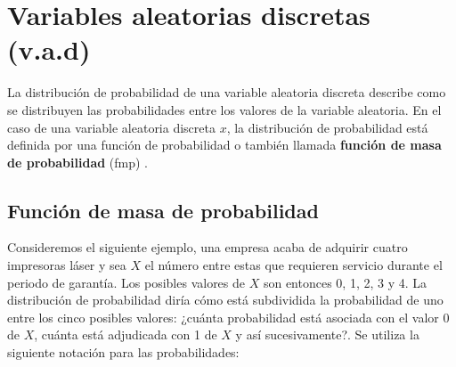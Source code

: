 \documentclass[
  11pt,
]{book}
\theoremstyle{definition}
\theoremstyle{definition}
\theoremstyle{definition}
\theoremstyle{definition}
\theoremstyle{remark}
\begin{document}
\begin{table}[H]
\centering
{}
\end{table}

\section{Variables aleatorias discretas (v.a.d)}\label{probabilidad-variable-aleatoria-discreta}

La distribución de probabilidad de una variable aleatoria discreta describe como se distribuyen las probabilidades entre los valores de la variable aleatoria. En el caso de una variable aleatoria discreta \(x\), la distribución de probabilidad está definida por una función de probabilidad o también llamada \textbf{función de masa de probabilidad} (fmp) \citep[página 90]{Devore}.

\subsection{Función de masa de probabilidad}\label{probabilidad-variable-aleatoria-discreta-fmp}

Consideremos el siguiente ejemplo, una empresa acaba de adquirir cuatro impresoras láser y sea \(X\) el número entre estas que requieren servicio durante el periodo de garantía. Los posibles valores de \(X\) son entonces 0, 1, 2, 3 y 4. La distribución de probabilidad diría cómo está subdividida la probabilidad de uno entre los cinco posibles valores: ¿cuánta probabilidad está asociada con el valor 0 de \(X\), cuánta está adjudicada con 1 de \(X\) y así sucesivamente?. Se utiliza la siguiente notación para las probabilidades:
\end{document}
